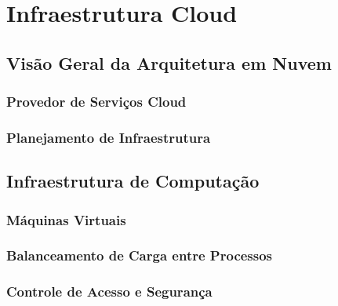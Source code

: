 
\section{Infraestrutura Cloud}

\subsection{Visão Geral da Arquitetura em Nuvem}

\subsubsection{Provedor de Serviços Cloud}


\subsubsection{Planejamento de Infraestrutura}


\subsection{Infraestrutura de Computação}

\subsubsection{Máquinas Virtuais}

\subsubsection{Balanceamento de Carga entre Processos}

\subsubsection{Controle de Acesso e Segurança}

